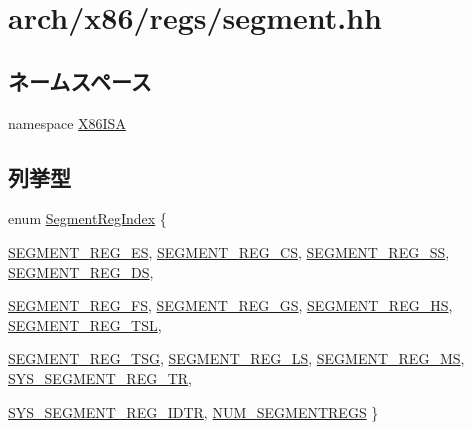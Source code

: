 \hypertarget{segment_8hh}{
\section{arch/x86/regs/segment.hh}
\label{segment_8hh}
}
\subsection*{ネームスペース}
\begin{DoxyCompactItemize}
\item 
namespace \hyperlink{namespaceX86ISA}{X86ISA}
\end{DoxyCompactItemize}
\subsection*{列挙型}
\begin{DoxyCompactItemize}
\item 
enum \hyperlink{namespaceX86ISA_acea32b07c2303d31296b1c07a16c4795}{SegmentRegIndex} \{ \par
\hyperlink{namespaceX86ISA_acea32b07c2303d31296b1c07a16c4795ad24d586eb77e26eb5161e8fbd7316ecb}{SEGMENT\_\-REG\_\-ES}, 
\hyperlink{namespaceX86ISA_acea32b07c2303d31296b1c07a16c4795a58c26669e3b5728e193101f2a63ffc18}{SEGMENT\_\-REG\_\-CS}, 
\hyperlink{namespaceX86ISA_acea32b07c2303d31296b1c07a16c4795aeeeafdcd5c36f63e75f11705bc26103d}{SEGMENT\_\-REG\_\-SS}, 
\hyperlink{namespaceX86ISA_acea32b07c2303d31296b1c07a16c4795a970af2f7bb70e46baa6ea6f84680dc68}{SEGMENT\_\-REG\_\-DS}, 
\par
\hyperlink{namespaceX86ISA_acea32b07c2303d31296b1c07a16c4795aa9482a7e438a7909e9bfe6c4e07fc957}{SEGMENT\_\-REG\_\-FS}, 
\hyperlink{namespaceX86ISA_acea32b07c2303d31296b1c07a16c4795addcc5aece7637ba09543ff92ac82df7a}{SEGMENT\_\-REG\_\-GS}, 
\hyperlink{namespaceX86ISA_acea32b07c2303d31296b1c07a16c4795a0d1dfaa56ad432fa2f754bf2ebe0f318}{SEGMENT\_\-REG\_\-HS}, 
\hyperlink{namespaceX86ISA_acea32b07c2303d31296b1c07a16c4795aa7d5283e26c33c63af0909ebf2ae0500}{SEGMENT\_\-REG\_\-TSL}, 
\par
\hyperlink{namespaceX86ISA_acea32b07c2303d31296b1c07a16c4795a8943a9a57238f28dee122ccd9044433c}{SEGMENT\_\-REG\_\-TSG}, 
\hyperlink{namespaceX86ISA_acea32b07c2303d31296b1c07a16c4795aafe026a2af8de6147a444e0171b09abb}{SEGMENT\_\-REG\_\-LS}, 
\hyperlink{namespaceX86ISA_acea32b07c2303d31296b1c07a16c4795afb3d9f8594226898b30603db62c1552f}{SEGMENT\_\-REG\_\-MS}, 
\hyperlink{namespaceX86ISA_acea32b07c2303d31296b1c07a16c4795a7d4a3605dd03bb44b86bffc884f7acf9}{SYS\_\-SEGMENT\_\-REG\_\-TR}, 
\par
\hyperlink{namespaceX86ISA_acea32b07c2303d31296b1c07a16c4795ac023d4308917b4ec9903ea747a402436}{SYS\_\-SEGMENT\_\-REG\_\-IDTR}, 
\hyperlink{namespaceX86ISA_acea32b07c2303d31296b1c07a16c4795a43afe462b4625cd9754dacd2f25c6bf6}{NUM\_\-SEGMENTREGS}
 \}
\end{DoxyCompactItemize}
